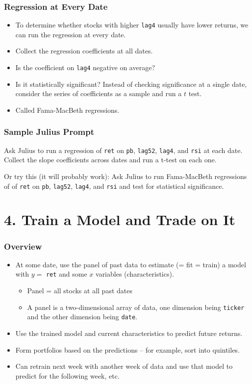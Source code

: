 \documentclass[10pt]{beamer}
\begin{document}
\begin{frame}[fragile]\frametitle{Regression at Every Date}
\begin{itemize}
\item To determine whether stocks with higher \verb!lag4! usually have lower returns, we can run the regression at every date.
\item Collect the regression coefficients at all dates.
\item Is the coefficient on \verb!lag4! negative on average?
\item Is it statistically significant? Instead of checking significance at a single date, consider the series of coefficients as a sample and \alert{run a $t$ test}.
\item Called Fama-MacBeth regressions.
\end{itemize}
\end{frame}


\begin{frame}[fragile]\frametitle{Sample Julius Prompt}
    Ask Julius to run a regression of \verb!ret! on \verb!pb!, \verb!lag52!, \verb!lag4!, and \verb!rsi! at each date.  Collect the slope coefficients across dates and run a t-test on each one.
\vspace{2em}

    Or try this (it will probably work): Ask Julius to run Fama-MacBeth regressions of of \verb!ret! on \verb!pb!, \verb!lag52!, \verb!lag4!, and \verb!rsi! and test for statistical significance.
\end{frame}

\section{4. Train a Model and Trade on It}

\begin{frame}[fragile]\frametitle{Overview}
    \begin{itemize}
    \item At some date, use the \alert{panel} of past data to estimate (= fit = train) a model with $y=$ \verb!ret! and some $x$ variables (characteristics).
    \begin{itemize}
    \item Panel = all stocks at all past dates
    \item A panel is a two-dimensional array of data, one dimension being \verb!ticker! and the other dimension being \verb!date!.
    \end{itemize}
    \item Use the trained model and current characteristics to predict future returns.
    \item Form portfolios based on the predictions -- for example, sort into quintiles.
    \item Can retrain next week with another week of data and use that model to predict for the following week, etc.
    \end{itemize}
\end{frame}
\end{document}
